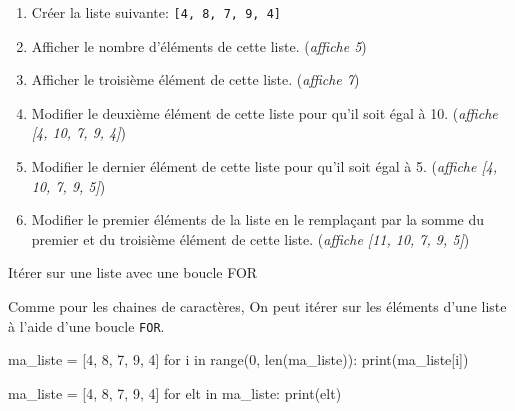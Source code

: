 \begin{exercice_cours}{}

	\begin{enumerate}
		\item Créer la liste suivante: \verb|[4, 8, 7, 9, 4]|
		\item Afficher le nombre d'éléments de cette liste. (\emph{affiche 5})
		\item Afficher le troisième élément de cette liste. (\emph{affiche 7})
		\item Modifier le deuxième élément de cette liste pour qu'il soit égal à 10. (\emph{affiche [4, 10, 7, 9, 4]})
		\item Modifier le dernier élément de cette liste pour qu'il soit égal à 5. (\emph{affiche [4, 10, 7, 9, 5]})
		\item Modifier le premier éléments de la liste en le remplaçant par la somme du premier et du troisième élément de cette liste. (\emph{affiche [11, 10, 7, 9, 5]})

	\end{enumerate}
\end{exercice_cours}

\begin{easybox}{Itérer sur une liste avec une boucle FOR}{}

	Comme pour les chaines de caractères, On peut itérer sur les éléments d'une liste à l'aide d'une boucle \verb|FOR|.	

	\smallskip
	\begin{minipage}{0.48\linewidth}
	\begin{CodePythontexAlt}[TaillePolice=\normalsize, Largeur=1\linewidth,Centre,PremLigne=1, Lignes=true,]{}
ma_liste = [4, 8, 7, 9, 4]
for i in range(0, len(ma_liste)):
	print(ma_liste[i])
		\end{CodePythontexAlt}
	\end{minipage}\hfill
	\begin{minipage}{0.48\linewidth}
		\begin{CodePythontexAlt}[TaillePolice=\normalsize, Largeur=1\linewidth,Centre,PremLigne=1, Lignes=true,]{}
ma_liste = [4, 8, 7, 9, 4]
for elt in ma_liste:
	print(elt)
		\end{CodePythontexAlt}
	\end{minipage}
\end{easybox}


